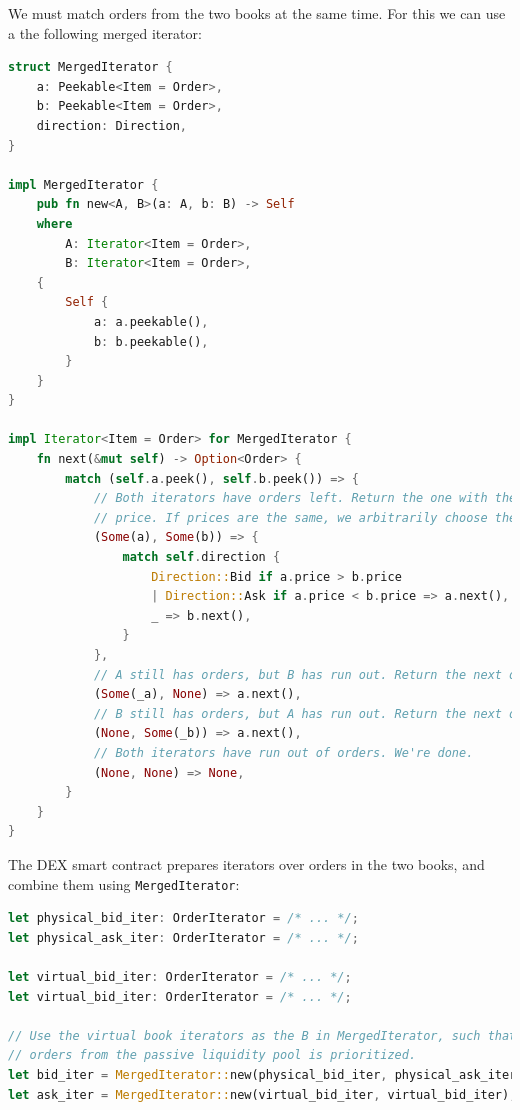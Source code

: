 \documentclass{article}
\begin{document}
We must match orders from the two books at the same time. For this we can use a the following merged iterator:

\begin{minipage}{\linewidth}
  \vspace*{0.1in}
  \begin{lstlisting}[language=rust]
struct MergedIterator {
    a: Peekable<Item = Order>,
    b: Peekable<Item = Order>,
    direction: Direction,
}

impl MergedIterator {
    pub fn new<A, B>(a: A, b: B) -> Self
    where
        A: Iterator<Item = Order>,
        B: Iterator<Item = Order>,
    {
        Self {
            a: a.peekable(),
            b: b.peekable(),
        }
    }
}

impl Iterator<Item = Order> for MergedIterator {
    fn next(&mut self) -> Option<Order> {
        match (self.a.peek(), self.b.peek()) => {
            // Both iterators have orders left. Return the one with the better
            // price. If prices are the same, we arbitrarily choose the order in B.
            (Some(a), Some(b)) => {
                match self.direction {
                    Direction::Bid if a.price > b.price
                    | Direction::Ask if a.price < b.price => a.next(),
                    _ => b.next(),
                }
            },
            // A still has orders, but B has run out. Return the next order in A.
            (Some(_a), None) => a.next(),
            // B still has orders, but A has run out. Return the next order in B.
            (None, Some(_b)) => a.next(),
            // Both iterators have run out of orders. We're done.
            (None, None) => None,
        }
    }
}
  \end{lstlisting}
\end{minipage}

The DEX smart contract prepares iterators over orders in the two books, and combine them using \texttt{MergedIterator}:

\begin{minipage}{\linewidth}
  \vspace*{0.1in}
  \begin{lstlisting}[language=rust]
let physical_bid_iter: OrderIterator = /* ... */;
let physical_ask_iter: OrderIterator = /* ... */;

let virtual_bid_iter: OrderIterator = /* ... */;
let virtual_bid_iter: OrderIterator = /* ... */;

// Use the virtual book iterators as the B in MergedIterator, such that
// orders from the passive liquidity pool is prioritized.
let bid_iter = MergedIterator::new(physical_bid_iter, physical_ask_iter);
let ask_iter = MergedIterator::new(virtual_bid_iter, virtual_bid_iter);
  \end{lstlisting}
\end{minipage}
\end{document}

